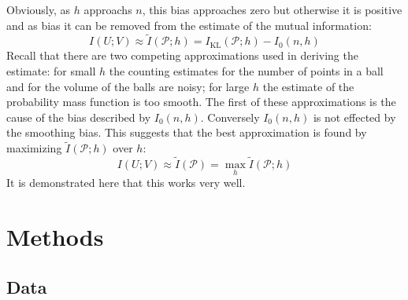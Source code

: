 \documentclass[12pt]{article}
\begin{document}
Obviously, as $h$ approachs $n$, this bias approaches zero but
otherwise it is positive and as bias it can be removed from the
estimate of the mutual information:
\begin{equation}
I(U;V)\approx\tilde{I}(\mathcal{P};h)=I_{\text{KL}}(\mathcal{P};h)-I_0(n,h)
\end{equation}
Recall that there are two competing approximations used in deriving
the estimate: for small $h$ the counting estimates for the number of
points in a ball and for the volume of the balls are noisy; for large
$h$ the estimate of the probability mass function is too smooth. The
first of these approximations is the cause of the bias described by
$I_0(n,h)$. Conversely $I_0(n,h)$ is not effected by the smoothing
bias. This suggests that the best approximation is found by maximizing
$\tilde{I}(\mathcal{P};h)$ over $h$:
\begin{equation}
I(U;V)\approx\tilde{I}(\mathcal{P})=\max_h{\tilde{I}(\mathcal{P};h)}
\end{equation}
It is demonstrated here that this works very well.

\section{Methods}

\subsection{Data}
\end{document}
